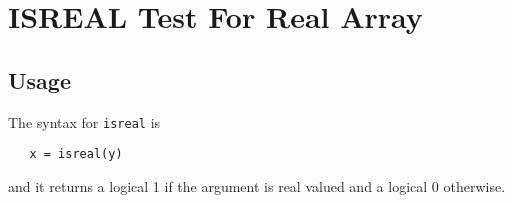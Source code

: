 \section{ISREAL Test For Real Array}

\subsection{Usage}

The syntax for \verb|isreal| is 
\begin{verbatim}
   x = isreal(y)
\end{verbatim}
and it returns a logical 1 if the argument is real valued
and a logical 0 otherwise.
